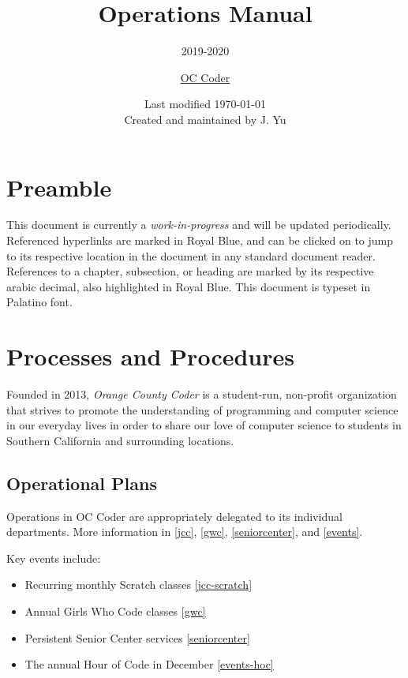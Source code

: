 \documentclass[twoside,11pt,letterpaper,abstracton]{scrartcl}
\title{Operations Manual}
\subtitle{2019-2020}
\author{\normalsize{\href{https://occoder.org}{OC Coder}}}
\date{\normalsize{Last modified \today \\ \small{Created and maintained by J. Yu}}}
\begin{document}
\maketitle

\section*{Preamble}

This document is currently a \emph{work-in-progress} and will be updated periodically. Referenced hyperlinks are marked in \color{RoyalBlue} Royal Blue\color{Black}, and can be clicked on to jump to its respective location in the document in any standard document reader. References to a chapter, subsection, or heading are marked by its respective arabic decimal, also highlighted in \color{RoyalBlue} Royal Blue\color{Black}. This document is typeset in Palatino font.

\tableofcontents

\newpage

\section{Processes and Procedures}

Founded in 2013, \emph{Orange County Coder} is a student-run, non-profit organization that strives to promote the understanding of programming and computer science in our everyday lives in order to share our love of computer science to students in Southern California and  surrounding locations.

\subsection{Operational Plans}

Operations in OC Coder are appropriately delegated to its individual departments. More information in \cref{jcc}, \cref{gwc}, \cref{seniorcenter}, and \cref{events}.

Key events include:
\begin{itemize}
    \item Recurring monthly Scratch classes     \cref{jcc-scratch}
    \item Annual Girls Who Code classes         \cref{gwc}
    \item Persistent Senior Center services     \cref{seniorcenter}
    \item The annual Hour of Code in December   \cref{events-hoc}
\end{itemize}
\end{document}
